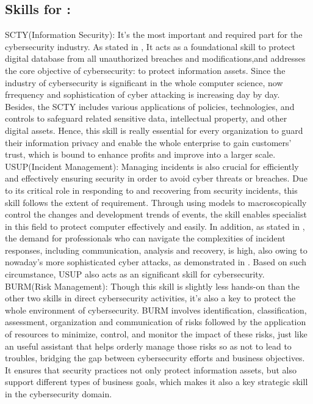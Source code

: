 \documentclass[a4paper, 11pt]{report}
\begin{document}
\subsection{Skills for \majD: \studD}

SCTY(Information Security): It's the most important and required part for the cybersecurity industry. As stated in \cite{cyber}, It acts as a foundational skill to protect digital database from all unauthorized breaches and modifications,and addresses the core objective of cybersecurity: to protect information assets. Since the industry of cybersecurity is significant in the whole computer science, now frrequency and sophistication of cyber attacking is increasing day by day. Besides, the SCTY includes various applications of policies, technologies, and controls to safeguard related sensitive data, intellectual property, and other digital assets. Hence, this skill is really essential for every organization to guard their information privacy and enable the whole enterprise to gain customers' trust, which is bound to enhance profits and improve into a larger scale. 
\\USUP(Incident Management): Managing incidents is also crucial for efficiently and effectively ensuring security in order to avoid cyber threats or breaches. Due to its critical role in responding to and recovering from security incidents, this skill follows the extent of requirement. Through using models to macroscopically control the changes and development trends of events, the skill enables specialist in this field to protect computer effectively and easily. In addition, as stated in \cite{security}, the demand for professionals who can navigate the complexities of incident responses, including communication, analysis and recovery, is high, also owing to nowaday’s more sophisticated cyber attacks, as demonstrated in \cite{crime}. Based on such circumstance, USUP also acts as an significant skill for cybersecurity.
\\BURM(Risk Management): Though this skill is slightly less hands-on than the other two skills in direct cybersecurity activities, it’s also a key to protect the whole environment of cybersecurity. BURM involves identification, classification, assessment, organization and communication of risks followed by the application of resources to minimize, control, and monitor the impact of these risks, just like an useful assistant that helps orderly manage those risks so as not to lead to troubles, bridging the gap between cybersecurity efforts and business objectives. It ensures that security practices not only protect information assets, but also support different types of business goals, which makes it also a key strategic skill in the cybersecurity domain.
\end{document}
